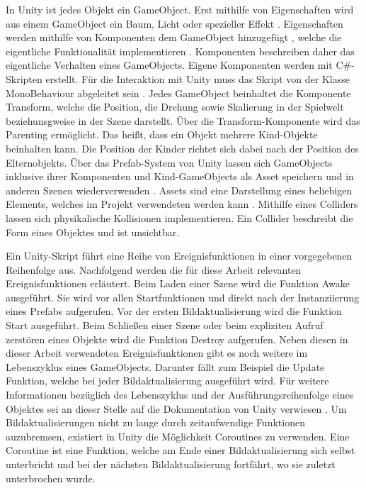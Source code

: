In Unity ist jedes Objekt ein GameObject. Erst mithilfe von Eigenschaften wird aus einem GameObject ein Baum, Licht oder spezieller Effekt \cite{GameObjects.2020}. Eigenschaften werden mithilfe von Komponenten dem GameObject hinzugefügt \cite{GameObjects.2020}, welche die eigentliche Funktionalität implementieren \cite{GameObject.2020}. Komponenten beschreiben daher das eigentliche Verhalten eines GameObjects. Eigene Komponenten werden mit C\#-Skripten erstellt. Für die Interaktion mit Unity muss das Skript von der Klasse MonoBehaviour abgeleitet sein \cite{CreateScripts.2020}. Jedes GameObject beinhaltet die Komponente Transform, welche die Position, die Drehung sowie Skalierung in der Spielwelt beziehunsgweise in der Szene darstellt. Über die Transform-Komponente wird das Parenting ermöglicht. Das heißt, dass ein Objekt mehrere Kind-Objekte beinhalten kann. Die Position der Kinder richtet sich dabei nach der Position des Elternobjekts. \cite{Components.2020} Über das Prefab-System von Unity lassen sich GameObjects inklusive ihrer Komponenten und Kind-GameObjects als Asset speichern und in anderen Szenen wiederverwenden \cite{Prefabs.2020}. Assets sind eine Darstellung eines beliebigen Elements, welches im Projekt verwendeten werden kann \cite{Assets.2020}. Mithilfe eines Colliders lassen sich physikalische Kollisionen implementieren. Ein Collider beschreibt die Form eines Objektes und ist unsichtbar. \cite{Colliders.2020}

Ein Unity-Skript führt eine Reihe von Ereignisfunktionen in einer vorgegebenen Reihenfolge aus. Nachfolgend werden die für diese Arbeit relevanten Ereignisfunktionen erläutert. Beim Laden einer Szene wird die Funktion {\ttfamily Awake} ausgeführt. Sie wird vor allen Startfunktionen und direkt nach der Instanziierung eines Prefabs aufgerufen. Vor der ersten Bildaktualisierung wird die Funktion {\ttfamily Start} ausgeführt. Beim Schließen einer Szene oder beim expliziten Aufruf zerstören eines Objekte wird die Funktion Destroy aufgerufen. Neben diesen in dieser Arbeit verwendeten Ereignisfunktionen gibt es noch weitere im Lebenszyklus eines GameObjects. Darunter fällt zum Beispiel die {\ttfamily Update} Funktion, welche bei jeder Bildaktualisierung ausgeführt wird. \cite{Order.2020} Für weitere Informationen bezüglich des Lebenszyklus und der Ausführungsreihenfolge eines Objektes sei an dieser Stelle auf die Dokumentation von Unity verwiesen \cite{Order.2020}. Um Bildaktualisierungen nicht zu lange durch zeitaufwendige Funktionen auzubremsen, existiert in Unity die Möglichkeit Coroutines zu verwenden. Eine Coroutine ist eine Funktion, welche am Ende einer Bildaktualisierung sich selbst unterbricht und bei der nächsten Bildaktualisierung fortfährt, wo sie zuletzt unterbrochen wurde. \cite{Coroutine.2020}

